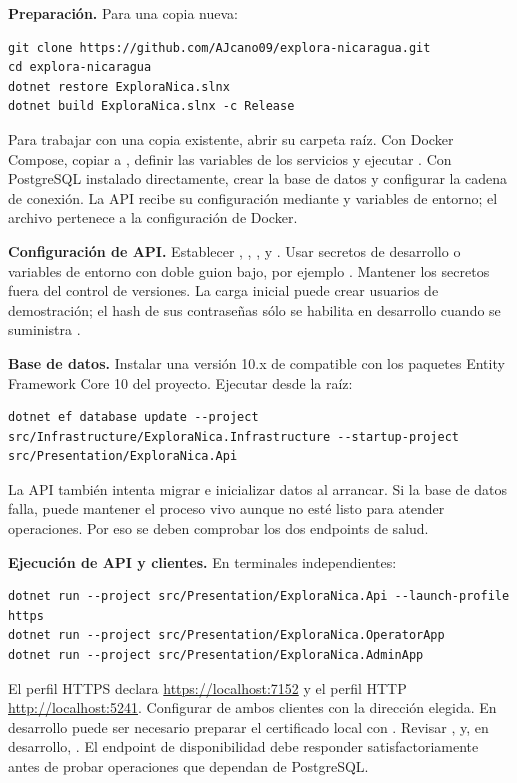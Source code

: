 \textbf{Preparación.} Para una copia nueva:
\begin{Verbatim}[fontsize=\small,breaklines=true]
git clone https://github.com/AJcano09/explora-nicaragua.git
cd explora-nicaragua
dotnet restore ExploraNica.slnx
dotnet build ExploraNica.slnx -c Release
\end{Verbatim}
Para trabajar con una copia existente, abrir su carpeta raíz. Con Docker Compose, copiar  a , definir las variables de los servicios y ejecutar . Con PostgreSQL instalado directamente, crear la base de datos y configurar la cadena de conexión. La API recibe su configuración mediante  y variables de entorno; el archivo  pertenece a la configuración de Docker.

\textbf{Configuración de API.} Establecer , , ,  y . Usar secretos de desarrollo o variables de entorno con doble guion bajo, por ejemplo . Mantener los secretos fuera del control de versiones. La carga inicial puede crear usuarios de demostración; el hash de sus contraseñas sólo se habilita en desarrollo cuando se suministra .

\textbf{Base de datos.} Instalar una versión 10.x de  compatible con los paquetes Entity Framework Core 10 del proyecto. Ejecutar desde la raíz:
\begin{Verbatim}[fontsize=\small,breaklines=true]
dotnet ef database update --project src/Infrastructure/ExploraNica.Infrastructure --startup-project src/Presentation/ExploraNica.Api
\end{Verbatim}
La API también intenta migrar e inicializar datos al arrancar. Si la base de datos falla, puede mantener el proceso vivo aunque no esté listo para atender operaciones. Por eso se deben comprobar los dos endpoints de salud.

\textbf{Ejecución de API y clientes.} En terminales independientes:
\begin{Verbatim}[fontsize=\small,breaklines=true]
dotnet run --project src/Presentation/ExploraNica.Api --launch-profile https
dotnet run --project src/Presentation/ExploraNica.OperatorApp
dotnet run --project src/Presentation/ExploraNica.AdminApp
\end{Verbatim}
El perfil HTTPS declara \url{https://localhost:7152} y el perfil HTTP \url{http://localhost:5241}. Configurar  de ambos clientes con la dirección elegida. En desarrollo puede ser necesario preparar el certificado local con . Revisar ,  y, en desarrollo, . El endpoint de disponibilidad debe responder satisfactoriamente antes de probar operaciones que dependan de PostgreSQL.

